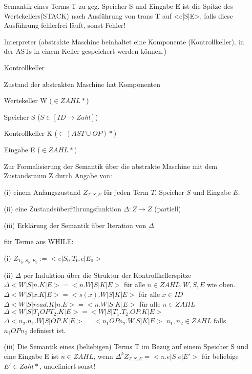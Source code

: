 \begin{compactitem}
Semantik eines Terms T zu geg. Speicher S und Eingabe E ist die Spitze des Wertekellers(STACK) nach Ausführung von trans T auf <e|S|E>, falls diese Ausführung fehlerfrei läuft, sonst Fehler!\\
	\item[Interpreter] (abstrakte Maschine beinhaltet eine Komponente (Kontrollkeller), in der ASTs in einem Keller gespeichert werden können.)
	\begin{compactitem}
		\item Kontrollkeller
		\item Zustand der abstrakten Maschine hat Komponenten
			\begin{compactitem}
				\item Wertekeller W ($\in ZAHL*$)
				\item Speicher S ($S \in [ID \rightarrow Zahl]$)
				\item Kontrollkeller K ($ \in (AST \cup OP)*$)
				\item Eingabe E ($\in ZAHL*$)
			\end{compactitem}
	\end{compactitem}
		Zur Formalisierung der Semantik über die abstrakte Maschine mit dem Zustandsraum Z durch Angabe von:
		\begin{compactitem}
			\item[(i)] einem Anfangszustand $Z_{T,S,E}$ für jeden Term $T$, Speicher $S$ und Eingabe $E$.
			\item[(ii)] eine Zustandsüberführungsfunktion $\Delta : Z \rightarrow Z$ (partiell)
			\item[(iii)] Erklärung der Semantik über Iteration von $\Delta$		
		\end{compactitem}
		für Terme aus WHILE:\\
			\begin{compactitem}
				\item[(i)]	$Z_{T_0,S_0,E_0} := <e|S_0|T_0.e|E_0>$
				\item[(ii)] $\Delta$ per Induktion über die Struktur der Kontrollkellerspitze\\
					$\Delta <W|S|n.K|E> = <n.W|S|K|E>$ für alle $n \in ZAHL, W,S,E$ wie oben.\\
					$\Delta <W|S|x.K|E> = <s(x).W|S|K|E>$ für alle $x \in ID$\\
					$\Delta <W|S|read.K|n.E> = <n.W|S|K|E>$ für alle $n \in ZAHL$\\
					$\Delta <W|S|T_1 OP T_2.K|E> = <W|S|T_1.T_2.OP.K|E>$ \\
					$\Delta <n_2.n_1.W|S|OP.K|E> = <n_1 OP n_2.W|S|K|E>$ $n_1, n_2 \in ZAHL$ falls $n_1 OP n_2$ definiert ist.\\			
				\item[(iii)] Die Semantik eines (beliebigen) Terms T im Bezug auf einem Speicher S und eine Eingabe E ist $n \in ZAHL$, wenn $\Delta^k Z_{T,S,E} = <n.e|S|e|E'>$ für beliebige $E' \in Zahl*$, undefiniert sonst!\\ 		
			\end{compactitem}		
\end{compactitem}

